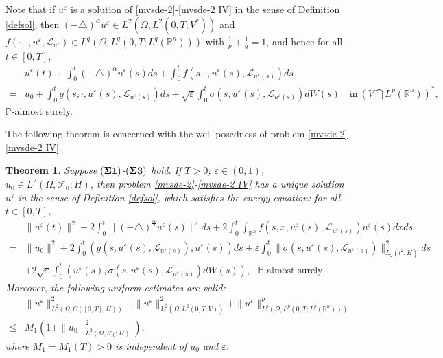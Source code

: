 \documentclass[11pt]{article}
\numberwithin{equation}{section}
\theoremstyle{plain}
\newtheorem{theorem}{Theorem}[section]
\def\leq{\leqslant}
\begin{document}
Note that if
$u^\varepsilon$
is a solution of
 \eqref{mvsde-2}-\eqref{mvsde-2 IV}
 in the sense of
 Definition \ref{defsol}, then
   $ (-\triangle)^{\alpha} u^\varepsilon \in L^2(\Omega, L^2(0,T; V^\ast) ) $
 and
   $ f(\cdot , \cdot,  u^\varepsilon , \mathcal{L}_{u^\varepsilon } ) \in L^q(\Omega, L^q(0,T; L^q(\mathbb{R}^n ) ) ) $
with $\frac{1}{p} + \frac{1}{q} =1$,
and hence   for all $t \in [0,T]$,
 \begin{align} \label{sfnsol-u}
    & u^\varepsilon (t)
      + \int_0^t (-\triangle)^{\alpha} u^\varepsilon(s) ds
      + \int_0^t f( s, \cdot, u^\varepsilon (s), \mathcal{L}_{u^\varepsilon (s)} )ds
        \nonumber \\
  = & u_0
      + \int_0^t g(s, \cdot, u^\varepsilon (s), \mathcal{L}_{u^\varepsilon (s)}) ds
      + \sqrt{\varepsilon} \int_0^t \sigma(s, u^\varepsilon (s), \mathcal{L}_{u^\varepsilon (s)} ) dW(s)
                                    \quad \text{in} \  \left( V \bigcap L^p(\mathbb{R}^n) \right)^\ast,
 \end{align}
 $\mathbb{P}$-almost surely.


The following theorem is concerned
with the   well-posedness of
problem  \eqref{mvsde-2}-\eqref{mvsde-2 IV}.

\begin{theorem} \label{mvsde-wellposed}
  Suppose $({\bf \Sigma 1})$-$({\bf \Sigma 3})$ hold.
  If $T>0$, $\varepsilon \in (0,1)$, $u_0 \in L^2(\Omega, \mathscr{F}_0; H)$,
  then problem \eqref{mvsde-2}-\eqref{mvsde-2 IV} has a unique solution
         $u^\varepsilon$
  in the sense of Definition \ref{defsol},
  which satisfies the energy equation: for all $t\in [0,T]$,
 \begin{align}\label{wang0321}
    & \| u^\varepsilon (t) \|^2
      + 2 \int_0^t
                 \| (-\triangle)^{\frac{\alpha}{2}} u^\varepsilon(s)
                 \|^2 ds
      + 2 \int_0^t \int_{\mathbb{R} ^n}  f( s, x, u^\varepsilon (s), \mathcal{L}_{u^\varepsilon (s)} ) u^\varepsilon (s) dx ds
        \nonumber \\
  = & \| u_0 \|^2
      + 2 \int_0^t (g(s, u^\varepsilon (s), \mathcal{L}_{u^\varepsilon (s)} ),  u^\varepsilon (s) ) ds
      + \varepsilon \int_0^t \| \sigma(s, u^\varepsilon (s), \mathcal{L}_{u^\varepsilon (s)} ) \|_{L_2(l^2,H)}^2 ds  \nonumber\\
    & + 2 \sqrt{\varepsilon} \int_0^t
          \left( u^\varepsilon (s),
         \sigma(s, u^\varepsilon (s), \mathcal{L}_{u^\varepsilon (s)}) dW(s)
                                      \right), \ \ \    \mathbb{P} \text{-almost surely}.
 \end{align}
 Moreover, the following uniform estimates are valid:
 \begin{align*}
         & \| u^\varepsilon \|_{L^2(\Omega, C([0,T], H) )}^2
           + \| u^\varepsilon \|_{L^2(\Omega, L^2(0,T; V) )}^2
           + \| u^\varepsilon \|_{L^p(\Omega, L^p(0,T; L^p(\mathbb{R}^n ) ) )}^p
                 \nonumber\\
    \leq & M_1
              \left( 1 + \| u_0 \|_{L^2(\Omega, \mathscr{F}_0; H)}^2
              \right),
 \end{align*}
 where $M_1=M_1(T) > 0$ is independent of $u_0$ and $\varepsilon$.
\end{theorem}
\end{document}
